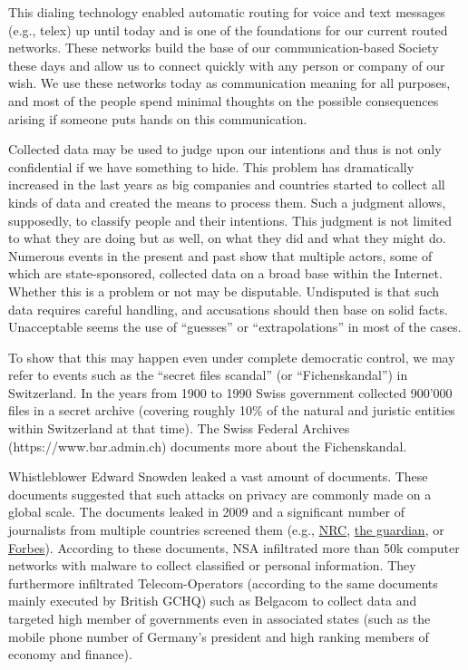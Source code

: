 \documentclass[10pt,journal,compsoc]{IEEEtran}
\begin{document}
This dialing technology enabled automatic routing for voice and text messages (e.g., telex) up until today and is one of the foundations for our current routed networks. These networks build the base of our communication-based Society these days and allow us to connect quickly with any person or company of our wish. We use these networks today as communication meaning for all purposes, and most of the people spend minimal thoughts on the possible consequences arising if someone puts hands on this communication. 

Collected data may be used to judge upon our intentions and thus is not only confidential if we have something to hide. This problem has dramatically increased in the last years as big companies and countries started to collect all kinds of data and created the means to process them. Such a judgment allows, supposedly, to classify people and their intentions. This judgment is not limited to what they are doing but as well, on what they did and what they might do. Numerous events in the present and past show that multiple actors, some of which are state-sponsored, collected data on a broad base within the Internet. Whether this is a problem or not may be disputable. Undisputed is that such data requires careful handling, and accusations should then base on solid facts. Unacceptable seems the use of ``guesses'' or ``extrapolations'' in most of the cases.

To show that this may happen even under complete democratic control, we may refer to events such as the ``secret files scandal'' (or  ``Fichenskandal'') in Switzerland. In the years from 1900 to 1990 Swiss government collected 900’000 files in a secret archive (covering roughly 10\% of the natural and juristic entities within Switzerland at that time). The Swiss Federal Archives (https://www.bar.admin.ch) documents more about the Fichenskandal.

Whistleblower Edward Snowden leaked a vast amount of documents. These documents suggested that such attacks on privacy are commonly made on a global scale. The documents leaked in 2009 and a significant number of journalists from multiple countries screened them (e.g., \href{http://www.nrc.nl/nieuws/2013/11/23/nederland-sinds-1946-doelwit-van-nsa}{NRC}, \href{https://www.theguardian.com/world/2013/jun/08/nsa-prism-server-collection-facebook-google}{the guardian}, or \href{https://www.forbes.com/sites/andygreenberg/2013/06/20/leaked-nsa-doc-says-it-can-collect-and-keep-your-encrypted-data-as-long-as-it-takes-to-crack-it/#6de23d75b07d}{Forbes}). According to these documents, NSA infiltrated more than 50k computer networks with malware to collect classified or personal information. They furthermore infiltrated Telecom-Operators (according to the same documents mainly executed by British GCHQ) such as Belgacom to collect data and targeted high member of governments even in associated states (such as the mobile phone number of Germany's president and high ranking members of economy and finance).
\end{document}
